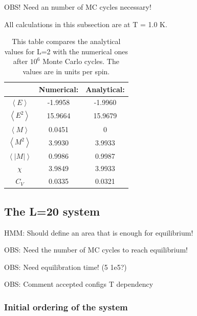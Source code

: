 OBS! Need an number of MC cycles necessary!

All calculations in this subsection are at T = 1.0 K. 

\begin{table}\caption{This table compares the analytical values for L=2 with the numerical ones after $10^6$ Monte Carlo cycles. The values are in units per spin.}\label{tab:compare_values}
	\begin{tabular}{ccc}
		& Numerical: & Analytical:\\ \hline
		$\left<E\right>$ &   -1.9958 & -1.9960\\
		$\left<E^2\right>$ &   15.9664 & 15.9679\\
		$\left<M\right>$ &    0.0451 & 0\\
		$\left<M^2\right>$ &    3.9930 & 3.9933\\
		$\left<|M|\right>$ &    0.9986 & 0.9987\\
		$\chi$ &   3.9849 & 3.9933\\
		$C_V$& 0.0335 & 0.0321\\
	\end{tabular}
\end{table}


\subsection{The L=20 system}

HMM: Should define an area that is enough for equilibrium!

OBS: Need the number of MC cycles to reach equilibrium!

OBS: Need equilibration time! (5 1e5?)

OBS: Comment accepted configs T dependency


\subsubsection{Initial ordering of the system}






